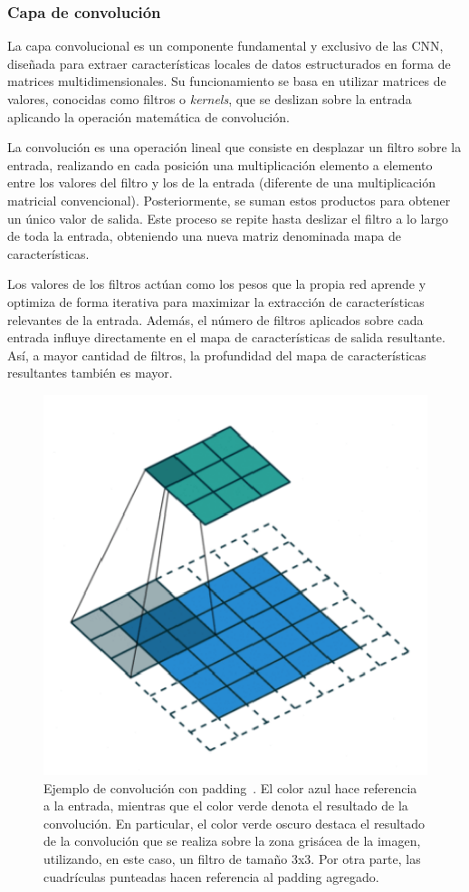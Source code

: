 \subsubsection{Capa de convolución}

La capa convolucional es un componente fundamental y exclusivo de las CNN, diseñada para extraer características locales de datos estructurados en forma de matrices multidimensionales. Su funcionamiento se basa en utilizar matrices de valores, conocidas como filtros o \emph{kernels}, que se deslizan sobre la entrada aplicando la operación matemática de convolución.\newline

La convolución es una operación lineal que consiste en desplazar un filtro sobre la entrada, realizando en cada posición una multiplicación elemento a elemento entre los valores del filtro y los de la entrada (diferente de una multiplicación matricial convencional). Posteriormente, se suman estos productos para obtener un único valor de salida. Este proceso se repite hasta deslizar el filtro a lo largo de toda la entrada, obteniendo una nueva matriz denominada mapa de características.\newline

Los valores de los filtros actúan como los pesos que la propia red aprende y optimiza de forma iterativa para maximizar la extracción de características relevantes de la entrada. Además, el número de filtros aplicados sobre cada entrada influye directamente en el mapa de características de salida resultante. Así, a mayor cantidad de filtros, la profundidad del mapa de características resultantes también es mayor.\newline

\begin{figure}[h]
    \centering
    \includegraphics[width=0.5\linewidth]{img/convolucion.png}
    \caption[Ejemplo de convolución con padding~\cite{Saha2018}.]{Ejemplo de convolución con padding~\cite{Saha2018}. El color azul hace referencia a la entrada, mientras que el color verde denota el resultado de la convolución. En particular, el color verde oscuro destaca el resultado de la convolución que se realiza sobre la zona grisácea de la imagen, utilizando, en este caso, un filtro de tamaño 3x3. Por otra parte, las cuadrículas punteadas hacen referencia al padding agregado.}\label{fig:convolucion}
\end{figure}

